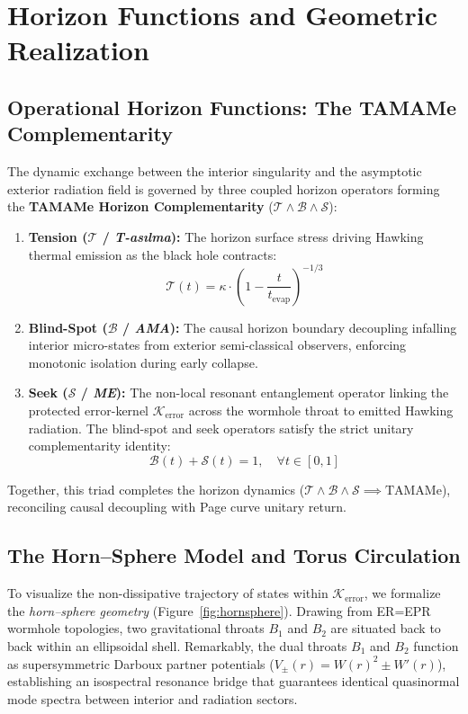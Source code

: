 \documentclass[11pt,a4paper]{article}
\newcommand{\T}{\mathcal{T}}
\newcommand{\B}{\mathcal{B}}
\newcommand{\Sk}{\mathcal{S}}
\newcommand{\Kerr}{\mathcal{K}_{\text{error}}}
\begin{document}
\section{Horizon Functions and Geometric Realization}\label{sec:geom}

\subsection{Operational Horizon Functions: The TAMAMe Complementarity}
The dynamic exchange between the interior singularity and the asymptotic exterior radiation field is governed by three coupled horizon operators forming the \textbf{TAMAMe Horizon Complementarity} ($\T \land \B \land \Sk$):
\begin{enumerate}[label=\arabic*.]
\item \textbf{Tension ($\T$ / \emph{T-as\i lma}):} The horizon surface stress driving Hawking thermal emission as the black hole contracts:
\begin{equation}
\T(t) = \kappa \cdot \left(1 - \frac{t}{t_{\text{evap}}}\right)^{-1/3}
\end{equation}
\item \textbf{Blind-Spot ($\B$ / \emph{AMA}):} The causal horizon boundary decoupling infalling interior micro-states from exterior semi-classical observers, enforcing monotonic isolation during early collapse.
\item \textbf{Seek ($\Sk$ / \emph{ME}):} The non-local resonant entanglement operator linking the protected error-kernel $\Kerr$ across the wormhole throat to emitted Hawking radiation. The blind-spot and seek operators satisfy the strict unitary complementarity identity:
\begin{equation}
\B(t) + \Sk(t) = 1, \quad \forall t \in [0, 1]
\end{equation}
\end{enumerate}
Together, this triad completes the horizon dynamics ($\T \land \B \land \Sk \implies \text{TAMAMe}$), reconciling causal decoupling with Page curve unitary return.

\subsection{The Horn--Sphere Model and Torus Circulation}\label{sec:hornsphere}
To visualize the non-dissipative trajectory of states within $\Kerr$, we formalize the \emph{horn--sphere geometry} (Figure~\ref{fig:hornsphere}). Drawing from ER=EPR wormhole topologies, two gravitational throats $B_1$ and $B_2$ are situated back to back within an ellipsoidal shell. Remarkably, the dual throats $B_1$ and $B_2$ function as supersymmetric Darboux partner potentials ($V_\pm(r) = W(r)^2 \pm W'(r)$), establishing an isospectral resonance bridge that guarantees identical quasinormal mode spectra between interior and radiation sectors.
\end{document}
